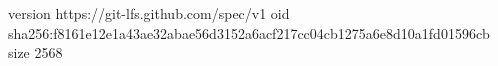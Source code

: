 version https://git-lfs.github.com/spec/v1
oid sha256:f8161e12e1a43ae32abae56d3152a6acf217cc04cb1275a6e8d10a1fd01596cb
size 2568
